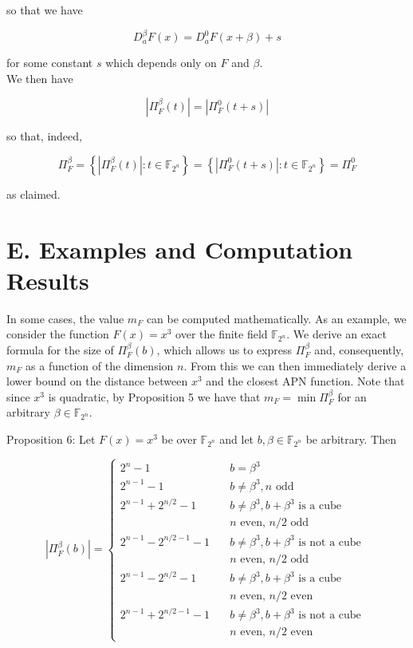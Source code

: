 \documentclass[10pt]{article}
\begin{document}
so that we have

$$
D_{a}^{\beta} F(x)=D_{a}^{0} F(x+\beta)+s
$$

for some constant $s$ which depends only on $F$ and $\beta$.\\
We then have

$$
\left|\Pi_{F}^{\beta}(t)\right|=\left|\Pi_{F}^{0}(t+s)\right|
$$

so that, indeed,

$$
\Pi_{F}^{\beta}=\left\{\left|\Pi_{F}^{\beta}(t)\right|: t \in \mathbb{F}_{2^{n}}\right\}=\left\{\left|\Pi_{F}^{0}(t+s)\right|: t \in \mathbb{F}_{2^{n}}\right\}=\Pi_{F}^{0}
$$

as claimed.

\section*{E. Examples and Computation Results}
In some cases, the value $m_{F}$ can be computed mathematically. As an example, we consider the function $F(x)=x^{3}$ over the finite field $\mathbb{F}_{2^{n}}$. We derive an exact formula for the size of $\Pi_{F}^{\beta}(b)$, which allows us to express $\Pi_{F}^{\beta}$ and, consequently, $m_{F}$ as a function of the dimension $n$. From this we can then immediately derive a lower bound on the distance between $x^{3}$ and the closest APN function. Note that since $x^{3}$ is quadratic, by Proposition 5 we have that $m_{F}=\min \Pi_{F}^{\beta}$ for an arbitrary $\beta \in \mathbb{F}_{2^{n}}$.

Proposition 6: Let $F(x)=x^{3}$ be over $\mathbb{F}_{2^{n}}$ and let $b, \beta \in \mathbb{F}_{2^{n}}$ be arbitrary. Then

\[
\left|\Pi_{F}^{\beta}(b)\right|= \begin{cases}2^{n}-1 & b=\beta^{3}  \tag{9}\\ 2^{n-1}-1 & b \neq \beta^{3}, n \text { odd } \\ 2^{n-1}+2^{n / 2}-1 & b \neq \beta^{3}, b+\beta^{3} \text { is a cube } \\ & n \text { even, } n / 2 \text { odd } \\ 2^{n-1}-2^{n / 2-1}-1 \quad & b \neq \beta^{3}, b+\beta^{3} \text { is not a cube } \\ & n \text { even, } n / 2 \text { odd } \\ 2^{n-1}-2^{n / 2}-1 \quad & b \neq \beta^{3}, b+\beta^{3} \text { is a cube } \\ & n \text { even, } n / 2 \text { even } \\ 2^{n-1}+2^{n / 2-1}-1 \quad & b \neq \beta^{3}, b+\beta^{3} \text { is not a cube } \\ & n \text { even, } n / 2 \text { even }\end{cases}
\]
\end{document}
